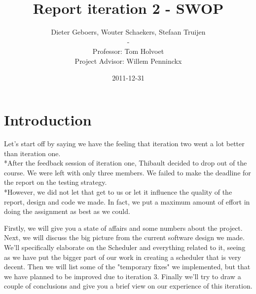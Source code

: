 \documentclass[11pt]{article}
\title{Report iteration 2 - SWOP}
\author{Dieter Geboers, Wouter Schaekers, Stefaan Truijen\\ - \\ Professor: Tom Holvoet \\ Project Advisor: Willem Penninckx}
\date{2011-12-31}
\begin{document}
\maketitle

\section{Introduction}
Let's start off by saying we have the feeling that iteration two went a lot better than iteration one.
\\*After the feedback session of iteration one, Thibault decided to drop out of the course. We were left with only three members. We failed to make the deadline for the report on the testing strategy.
\\*However, we did not let that get to us or let it influence the quality of the report, design and code we made. In fact, we put a maximum amount of effort in doing the assignment as best as we could.\newline

Firstly, we will give you a state of affairs and some numbers about the project. Next, we will discuss the big picture from the current software design we made. We'll specifically elaborate on the Scheduler and everything related to it, seeing as we have put the bigger part of our work in creating a scheduler that is very decent. Then we will list some of the "temporary fixes" we implemented, but that we have planned to be improved due to iteration 3. Finally we'll try to draw a couple of conclusions and give you a brief view on our experience of this iteration.
\pagebreak
\tableofcontents
\pagebreak
\end{document}
